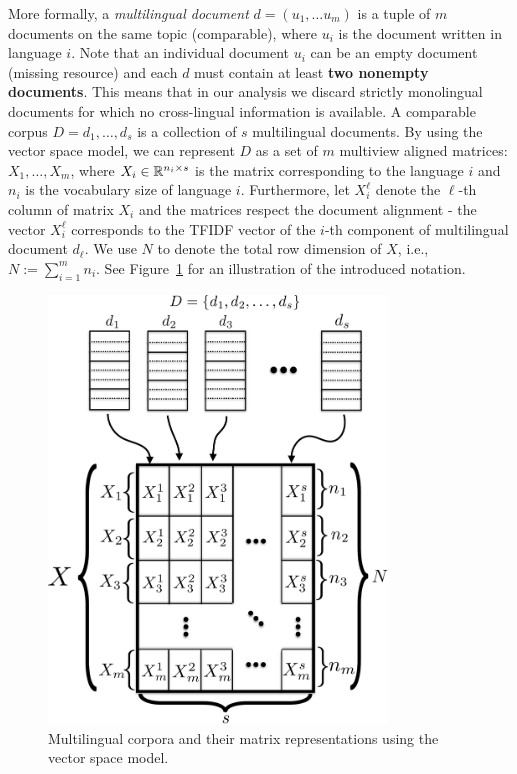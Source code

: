 More formally, a \emph{multilingual document} $d = (u_1,\ldots u_m)$ is a tuple of $m$ documents
on the same topic (comparable), where $u_i$ is the document written in language $i$. Note that
an individual document $u_i$ can be an empty document (missing resource) and each $d$ must contain
at least \textbf{two nonempty documents}. This means that in our analysis we discard strictly
monolingual documents for which no cross-lingual information is available. A comparable corpus
$D = {d_1, \ldots, d_s}$ is a collection of $s$ multilingual documents. By using the vector space
model, we can represent $D$ as a set of $m$ multiview aligned matrices:
$X_1,\ldots,X_m$, where $X_i \in \mathbb{R}^{n_i \times s}$
is the matrix corresponding to the language $i$ and $n_i$ is the vocabulary size of language $i$.
Furthermore, let $X_i^{\ell}$ denote the $\ell$-th column of matrix $X_i$ and the matrices respect
the document alignment - the vector $X_i^\ell$ corresponds to the TFIDF vector of the $i$-th component
of multilingual document $d_\ell$. We use $N$ to denote the total row dimension of $X$, i.e.,
$N:= \sum_{i=1}^m n_i$. See Figure~\ref{fig:stacked_matrices} for an illustration of the introduced notation.

\begin{figure}[tbp]
\centering
\includegraphics[width=9cm]{figures/stacked_matrices1-crop.pdf}
\caption{\label{fig:stacked_matrices} Multilingual corpora and their matrix representations using the vector space model.}
\end{figure}

